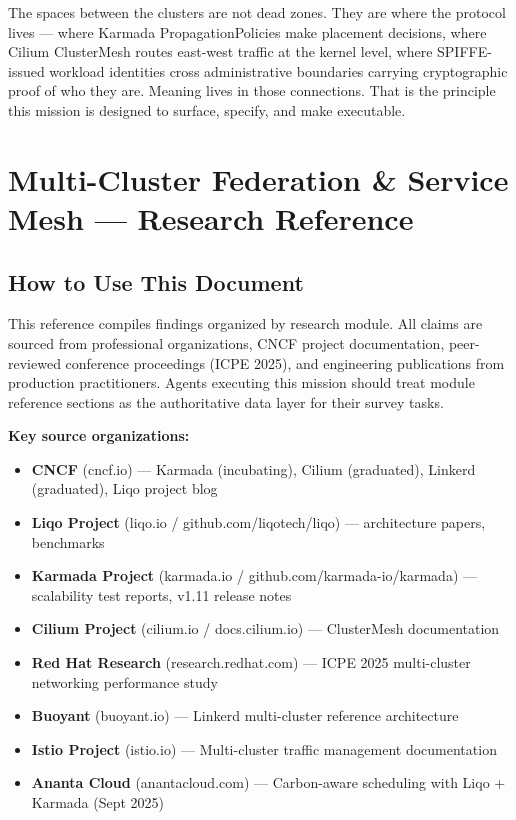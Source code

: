 \documentclass[11pt,letterpaper]{article}
\newcommand{\stageheader}[2]{%
  \noindent\colorbox{#2}{\makebox[\textwidth][l]{%
    \textcolor{white}{\bfseries\sffamily\hspace{6pt}#1\hspace{6pt}}}}%
  \vspace{0.5em}\par%
}
\begin{document}
The spaces between the clusters are not dead zones. They are where the protocol lives --- where Karmada PropagationPolicies make placement decisions, where Cilium ClusterMesh routes east-west traffic at the kernel level, where SPIFFE-issued workload identities cross administrative boundaries carrying cryptographic proof of who they are. Meaning lives in those connections. That is the principle this mission is designed to surface, specify, and make executable.

\newpage

\stageheader{STAGE 2 --- RESEARCH REFERENCE}{secondary}

\section{Multi-Cluster Federation \& Service Mesh --- Research Reference}

\subsection{How to Use This Document}

This reference compiles findings organized by research module. All claims are sourced from professional organizations, CNCF project documentation, peer-reviewed conference proceedings (ICPE 2025), and engineering publications from production practitioners. Agents executing this mission should treat module reference sections as the authoritative data layer for their survey tasks.

\textbf{Key source organizations:}
\begin{itemize}[leftmargin=1.5em]
  \item \textbf{CNCF} (cncf.io) --- Karmada (incubating), Cilium (graduated), Linkerd (graduated), Liqo project blog
  \item \textbf{Liqo Project} (liqo.io / github.com/liqotech/liqo) --- architecture papers, benchmarks
  \item \textbf{Karmada Project} (karmada.io / github.com/karmada-io/karmada) --- scalability test reports, v1.11 release notes
  \item \textbf{Cilium Project} (cilium.io / docs.cilium.io) --- ClusterMesh documentation
  \item \textbf{Red Hat Research} (research.redhat.com) --- ICPE 2025 multi-cluster networking performance study
  \item \textbf{Buoyant} (buoyant.io) --- Linkerd multi-cluster reference architecture
  \item \textbf{Istio Project} (istio.io) --- Multi-cluster traffic management documentation
  \item \textbf{Ananta Cloud} (anantacloud.com) --- Carbon-aware scheduling with Liqo + Karmada (Sept 2025)
\end{itemize}
\end{document}

